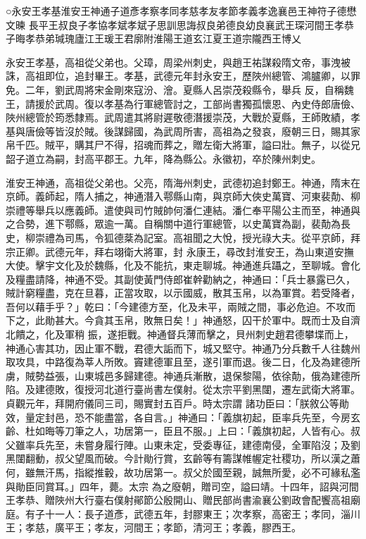 
\begin{pinyinscope}

 ○永安王孝基淮安王神通子道彥孝察孝同孝慈孝友孝節孝義孝逸襄邑王神符子德懋文暕
 長平王叔良子孝協孝斌孝斌子思訓思誨叔良弟德良幼良襄武王琛河間王孝恭子晦孝恭弟瑊瑰廬江王瑗王君廓附淮陽王道玄江夏王道宗隴西王博乂



 永安王孝基，高祖從父弟也。父璋，周梁州刺史，與趙王祐謀殺隋文帝，事洩被誅，高祖即位，追封畢王。孝基，武德元年封永安王，歷陜州總管、鴻臚卿，以罪免。二年，劉武周將宋金剛來寇汾、澮。夏縣人呂崇茂殺縣令，舉兵
 反，自稱魏王，請援於武周。復以孝基為行軍總管討之，工部尚書獨孤懷恩、內史侍郎唐儉、陜州總管於筠悉隸焉。武周遣其將尉遲敬德潛援崇茂，大戰於夏縣，王師敗績，孝基與唐儉等皆沒於賊。後謀歸國，為武周所害，高祖為之發哀，廢朝三日，賜其家帛千匹。賊平，購其尸不得，招魂而葬之，贈左衛大將軍，謚曰壯。無子，以從兄韶子道立為嗣，封高平郡王。九年，降為縣公。永徽初，卒於陳州刺史。



 淮安王神通，高祖從父弟也。父亮，隋海州刺史，武德初追封鄭王。神通，隋末在京師。義師起，隋人捕之，神通潛入鄠縣山南，與京師大俠史萬寶、河東裴勣、柳崇禮等舉兵以應義師。遣使與司竹賊帥何潘仁連結。潘仁奉平陽公主而至，神通與之合勢，進下鄠縣，眾逾一萬。自稱關中道行軍總管，以史萬寶為副，裴勣為長史，柳崇禮為司馬，令狐德棻為記室。高祖聞之大悅，授光祿大夫。從平京師，拜宗正卿。武德元年，拜右翊衛大將軍，封
 永康王，尋改封淮安王，為山東道安撫大使。擊宇文化及於魏縣，化及不能抗，東走聊城。神通進兵躡之，至聊城。會化及糧盡請降，神通不受。其副使黃門侍郎崔幹勸納之，神通曰：「兵士暴露已久，賊計窮糧盡，克在旦暮，正當攻取，以示國威，散其玉帛，以為軍賞。若受降者，吾何以藉手乎？」乾曰：「今建德方至，化及未平，兩賊之間，事必危迫。不攻而下之，此勛甚大。今貪其玉帛，敗無日矣！」神通怒，囚干於軍中。既而士及自濟北饋之，化及軍稍
 振，遂拒戰。神通督兵薄而擊之，貝州刺史趙君德攀堞而上，神通心害其功，因止軍不戰，君德大詬而下，城又堅守。神通乃分兵數千人往魏州取攻具，中路復為莘人所敗。竇建德軍且至，遂引軍而退。後二日，化及為建德所虜，賊勢益張，山東城邑多歸建德。神通兵漸散，退保黎陽，依徐勣，俄為建德所陷。及建德敗，復授河北道行臺尚書左僕射。從太宗平劉黑闥，遷左武衛大將軍。貞觀元年，拜開府儀同三司，賜實封五百戶。時太宗謂
 諸功臣曰：「朕敘公等勛效，量定封邑，恐不能盡當，各自言。」神通曰：「義旗初起，臣率兵先至，今房玄齡、杜如晦等刀筆之人，功居第一，臣且不服。」上曰：「義旗初起，人皆有心。叔父雖率兵先至，未嘗身履行陣。山東未定，受委專征，建德南侵，全軍陷沒；及劉黑闥翻動，叔父望風而破。今計勛行賞，玄齡等有籌謀帷幄定社稷功，所以漢之蕭何，雖無汗馬，指縱推轂，故功居第一。叔父於國至親，誠無所愛，必不可緣私濫與勛臣同賞耳。」四年，薨。太宗
 為之廢朝，贈司空，謚曰靖。十四年，詔與河間王孝恭、贈陜州大行臺右僕射鄖節公殷開山、贈民部尚書渝襄公劉政會配饗高祖廟庭。有子十一人：長子道彥，武德五年，封膠東王；次孝察，高密王；孝同，淄川王；孝慈，廣平王；孝友，河間王；孝節，清河王；孝義，膠西王。




\end{pinyinscope}
